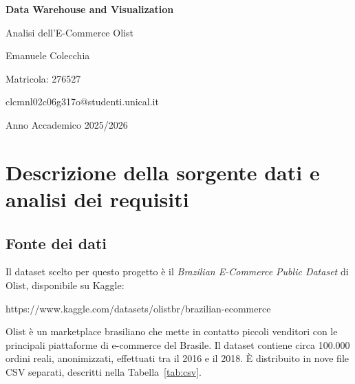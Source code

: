 \documentclass[12pt,a4paper]{article}
\begin{document}
\thispagestyle{empty}

\begin{titlepage}
  \centering
  \vspace*{4cm}
  {\LARGE\textbf{Data Warehouse and Visualization}\par}
  \vspace{0.8cm}
  {\large Analisi dell'E-Commerce Olist\par}
  \vspace{1.5cm}
  {\large Emanuele Colecchia\par}
  {\large Matricola: 276527\par}
  \vspace{0.5cm}
  {\ttfamily clcmnl02c06g317o@studenti.unical.it\par}
  \vspace{0.5cm}
  {\large Anno Accademico 2025/2026\par}
\end{titlepage}

\tableofcontents
\clearpage

\section{Descrizione della sorgente dati e analisi dei requisiti}

\subsection{Fonte dei dati}

Il dataset scelto per questo progetto è il \textit{Brazilian E-Commerce Public Dataset} di
Olist, disponibile su Kaggle:

\begin{center}
  \ttfamily https://www.kaggle.com/datasets/olistbr/brazilian-ecommerce
\end{center}

Olist è un marketplace brasiliano che mette in contatto piccoli venditori con le
principali piattaforme di e-commerce del Brasile. Il dataset contiene circa 100.000
ordini reali, anonimizzati, effettuati tra il 2016 e il 2018. È distribuito in nove file
CSV separati, descritti nella Tabella~\ref{tab:csv}.
\end{document}
